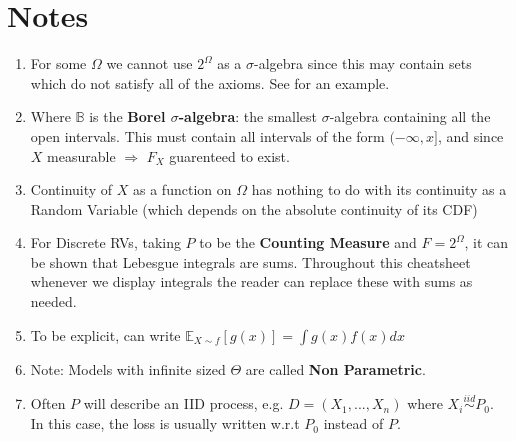 \documentclass[a4paper,portrait,columns=2, hidelinks]{cheatsheet}
\begin{document}
\newpage

\section{Notes}
\begin{enumerate}
	\item \label{sec:ft1} For some \(\Omega\) we cannot use \(2^{\Omega}\) as a \(\sigma\)-algebra since this may contain sets which do not satisfy all of the axioms. See \cite{Rosenthal2006} for an example.
	\item \label{sec:ft2} Where $\mathbb{B}$ is the \textbf{Borel \(\sigma\)-algebra}: the smallest \(\sigma\)-algebra containing all the open intervals. This must contain all intervals of the form \((-\infty, x]\), and since \(X\) measurable \(\Rightarrow\) \(F_X\) guarenteed to exist.
	\item \label{sec:ft3} Continuity of \(X\) as a function on \(\Omega\) has nothing to do with its continuity as a Random Variable (which depends on the absolute continuity of its CDF) \cite{976739}
	\item \label{sec:ft4} For Discrete RVs, taking \(P\) to be the \textbf{Counting Measure} and \(F=2^{\Omega}\), it can be shown that Lebesgue integrals are sums. Throughout this cheatsheet whenever we display integrals the reader can replace these with sums as needed.
	\item \label{sec:ft5} To be explicit, can write \(\mathbb{E}_{X \sim f}[g(x)]=\int g(x)f(x)dx\)
	\item \label{sec:ft6} Note: Models with infinite sized \(\Theta\) are called \textbf{Non Parametric}.
	\item \label{sec:ft7} Often $P$ will describe an IID process, e.g. $D = (X_1,...,X_n)$ where $X_i \overset{iid}\sim P_0$. In this case, the loss is usually written w.r.t $P_0$ instead of $P$.
\end{enumerate}



\end{document}
